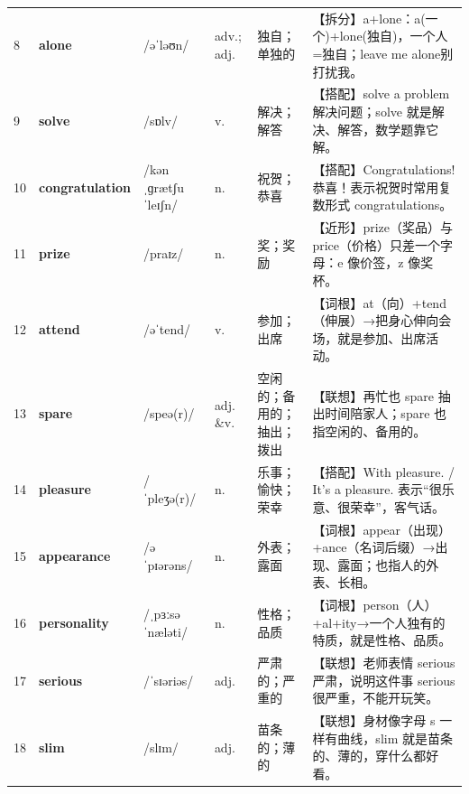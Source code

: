 \documentclass[UTF8,a4paper,11pt,oneside]{ctexbook}
\newcommand{\cellword}[1]{{\bfseries\textcolor{wordcol}{#1}}}
\newcommand{\cellipa}[1]{{\footnotesize\textcolor{ipacol}{#1}}}
\newcommand{\cellpos}[1]{\textcolor{poscol}{#1}}
\newcommand{\cellno}[1]{\textcolor{volcolor!75!black}{#1}}
\begin{document}
{\begin{longtable}{@{}C{0.045\textwidth}L{0.155\textwidth}L{0.175\textwidth}C{0.070\textwidth}L{0.180\textwidth}L{0.282\textwidth}@{}}
\cellno{8} & \cellword{alone} & \cellipa{/əˈləʊn/} & \cellpos{adv.;\allowbreak{} adj.} & 独自；单独的 & \textcolor{tagSplit}{【拆分】}a+lone：a(一个)+lone(独自)，一个人=独自；leave me alone别打扰我。 \\
 \cellno{9} & \cellword{solve} & \cellipa{/sɒlv/} & \cellpos{v.} & 解决；解答 & \textcolor{tagColloc}{【搭配】}solve a problem 解决问题；solve 就是解决、解答，数学题靠它解。 \\
\cellno{10} & \cellword{congratulation} & \cellipa{/kənˌɡrætʃuˈleɪʃn/} & \cellpos{n.} & 祝贺；恭喜 & \textcolor{tagColloc}{【搭配】}Congratulations! 恭喜！表示祝贺时常用复数形式 congratulations。 \\
 \cellno{11} & \cellword{prize} & \cellipa{/praɪz/} & \cellpos{n.} & 奖；奖励 & \textcolor{tagNear}{【近形】}prize（奖品）与 price（价格）只差一个字母：e 像价签，z 像奖杯。 \\
\cellno{12} & \cellword{attend} & \cellipa{/əˈtend/} & \cellpos{v.} & 参加；出席 & \textcolor{tagRoot}{【词根】}at（向）+tend（伸展）→\allowbreak{}把身心伸向会场，就是参加、出席活动。 \\
 \cellno{13} & \cellword{spare} & \cellipa{/speə(r)/} & \cellpos{adj. \&v.} & 空闲的；备用的；抽出；拨出 & \textcolor{tagAssoc}{【联想】}再忙也 spare 抽出时间陪家人；spare 也指空闲的、备用的。 \\
\cellno{14} & \cellword{pleasure} & \cellipa{/ˈpleʒə(r)/} & \cellpos{n.} & 乐事；愉快；荣幸 & \textcolor{tagColloc}{【搭配】}With pleasure. / It's a pleasure. 表示“很乐意、很荣幸”，客气话。 \\
 \cellno{15} & \cellword{appearance} & \cellipa{/əˈpɪərəns/} & \cellpos{n.} & 外表；露面 & \textcolor{tagRoot}{【词根】}appear（出现）+ance（名词后缀）→\allowbreak{}出现、露面；也指人的外表、长相。 \\
\cellno{16} & \cellword{personality} & \cellipa{/ˌpɜːsəˈnæləti/} & \cellpos{n.} & 性格；品质 & \textcolor{tagRoot}{【词根】}person（人）+al+ity→\allowbreak{}一个人独有的特质，就是性格、品质。 \\
 \cellno{17} & \cellword{serious} & \cellipa{/ˈsɪəriəs/} & \cellpos{adj.} & 严肃的；严重的 & \textcolor{tagAssoc}{【联想】}老师表情 serious 严肃，说明这件事 serious 很严重，不能开玩笑。 \\
\cellno{18} & \cellword{slim} & \cellipa{/slɪm/} & \cellpos{adj.} & 苗条的；薄的 & \textcolor{tagAssoc}{【联想】}身材像字母 s 一样有曲线，slim 就是苗条的、薄的，穿什么都好看。 \\

\end{longtable}}
\end{document}
